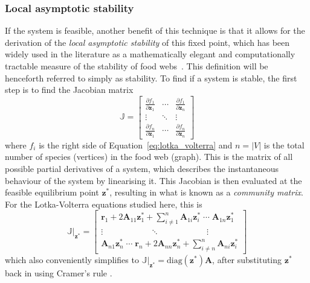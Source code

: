 \subsubsection{Local asymptotic stability}
If the system is feasible, another benefit of this technique is that it allows for the derivation of the \emph{local asymptotic stability} of this fixed point, which has been widely used in the literature as a mathematically elegant and computationally tractable measure of the stability of food webs~\cite{May1973, Emmerson2004}. This definition will be henceforth referred to simply as stability. 
To find if a system is stable, the first step is to find the Jacobian matrix
\begin{equation}
  \mathbb{J} = \begin{bmatrix}
    \frac{\partial f_1}{\partial \mathbf{z}_1} & 
    \cdots &
    \frac{\partial f_1}{\partial \mathbf{z}_n} \\
    \vdots &
    \ddots &
    \vdots \\
    \frac{\partial f_n}{\partial \mathbf{z}_1} & 
    \cdots &
    \frac{\partial f_n}{\partial \mathbf{z}_n}
  \end{bmatrix}
\end{equation}
where $f_i$ is the right side of Equation~\eqref{eq:lotka_volterra} and $n=|V|$ is the total number of species (vertices) in the food web (graph).
This is the matrix of all possible partial derivatives of a system, which describes the instantaneous behaviour of the system by linearising it. This Jacobian is then evaluated at the feasible equilibrium point $\mathbf{z}^*$, resulting in what is known as a \emph{community matrix}. For the Lotka-Volterra equations studied here, this is
\begin{equation}
  \mathbb{J}|_\mathbf{z^*} = \begin{bmatrix}
    \mathbf{r}_1 + 2\mathbf{A}_{11}\mathbf{z}_1^* + \sum_{i\neq 1}^n\mathbf{A}_{1i}\mathbf{z}_i^*
    \;\cdots\;
    \mathbf{A}_{1n}\mathbf{z}_1^*\\
    \vdots 
    \qquad\qquad\quad\;\;\ddots\qquad\qquad\quad\;\;
    \vdots \\
    \mathbf{A}_{n1}\mathbf{z}_n^*
    \;\cdots\;
    \mathbf{r}_n + 2\mathbf{A}_{nn}\mathbf{z}_n^* + \sum_{i\neq n}^n\mathbf{A}_{ni}\mathbf{z}_i^* 
  \end{bmatrix}
  \label{eq:jacobian_evaluated}
\end{equation}
which also conveniently simplifies to $\mathbb{J}|_\mathbf{z^*} = \mathrm{diag}(\mathbf{z^*})\mathbf{A}$, after substituting $\mathbf{z^*}$ back in using Cramer's rule \cite{May1973}.
